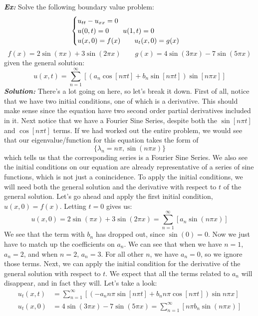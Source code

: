 \documentclass{article}
\begin{document}
\newpage
\noindent\textbf{\textit{Ex:}} Solve the following boundary value problem:
\[
\begin{cases}
u_{tt} - u_{xx} = 0\\
u(0,t) = 0\qquad u(1,t) = 0\\
u(x,0) = f(x)\qquad u_{t}(x,0) = g(x)
\end{cases}\\
\]
\[f(x) = 2\sin{(\pi x)} + 3\sin{(2\pi x)}\qquad g(x) = 4\sin{(3\pi x)} - 7\sin{(5\pi x)}\]
given the general solution:
\[u(x,t) = \sum_{n=1}^{\infty}\left[\left(a_{n}\cos{[n\pi t]} + b_{n}\sin{[n\pi t]}\right)\sin{[n\pi
x]}\right]\]
\indent\textbf{\textit{Solution:}} There's a lot going on here, so let's break
it down. First of all, notice that we have two initial conditions, one of which
is a derivative. This should make sense since the equation have two second order
partial derivatives included in it. Next notice that we have a Fourier Sine Series,
despite both the $\sin{[n\pi t]}$ and $\cos{[n\pi t]}$ terms. If we had worked
out the entire problem, we would see that our eigenvalue/function for this
equation takes the form of
\[
\{\lambda_{n} = n\pi, \sin{(n\pi x)}\}
\]
\noindent which tells us that the corresponding series is a Fourier Sine Series.
We also see the initial conditions on our equation are already representative
of a series of sine functions, which is not just a conincidence. To apply the
initial conditions, we will need both the general solution and the derivative
with respect to $t$ of the general solution. Let's go ahead and apply the first
initial condition, $u(x,0) = f(x)$. Letting $t= 0$ gives us:
\[
u(x,0) = 2\sin{(\pi x)} + 3\sin{(2\pi x)} = \sum_{n=1}^{\infty}\left[a_{n}\sin{(n\pi x)}\right]
\]
\noindent We see that the term with $b_{n}$ has dropped out, since
$\sin{(0)} = 0$. Now we just have to match up the coefficients on $a_{n}$. We
can see that when we have $n=1$, $a_{n} = 2$, and when $n=2$, $a_{n} = 3$. For
all other $n$, we have $a_{n} = 0$, so we ignore those terms. Next, we can apply
the initial condition for the derivative of the general solution with respect to
$t$. We expect that all the terms related to $a_{n}$ will disappear, and in fact
they will. Let's take a look:
\begin{align*}
u_{t}(x,t) &= \sum_{n=1}^{\infty}\left[(-a_{n}n\pi\sin{[n\pi t]} + b_{n}n\pi\cos{[n\pi t]})\sin{n\pi
x}\right]\\
u_{t}(x,0) &= 4\sin{(3\pi x)} - 7\sin{(5\pi x)} = \sum_{n=1}^{\infty}\left[n\pi b_{n}\sin{(n\pi
x)}\right]
\end{align*}
\end{document}
